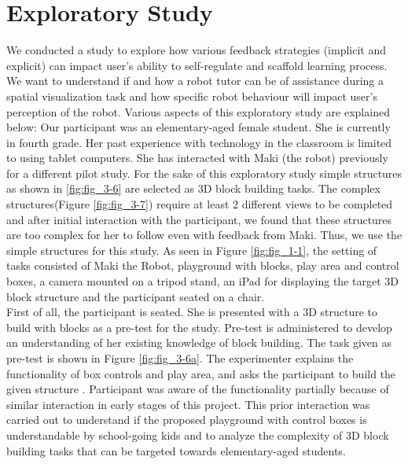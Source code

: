 \chapter{Exploratory Study}
\label{chap:four}

We conducted a study to explore how various feedback strategies (implicit and explicit) can impact user's ability to self-regulate and scaffold learning process. We want to understand if and how a robot tutor can be of assistance during a spatial visualization task and how specific robot behaviour will impact user's perception of the robot. Various aspects of this exploratory study are explained below:
Our participant was an elementary-aged female student. She is currently in fourth grade. Her past experience with technology in the classroom is limited to using tablet computers. She has interacted with Maki (the robot) previously for a different pilot study.
For the sake of this exploratory study simple structures as shown in \ref{fig:fig_3-6} are selected as 3D block building tasks. The complex structures(Figure \ref{fig:fig_3-7}) require at least 2 different views to be completed and after initial interaction with the participant, we found that these structures are too complex for her to follow even with feedback from Maki. Thus, we use the simple structures for this study.
As seen in Figure \ref{fig:fig_1-1}, the setting of tasks consisted of Maki the Robot, playground with blocks, play area and control boxes, a camera mounted on a tripod stand, an iPad for displaying the target 3D block structure and the participant seated on a chair. \\
First of all, the participant is seated. She is presented with a 3D structure to build with blocks as a pre-test for the study. Pre-test is administered to develop an understanding of her existing knowledge of block building. The task given as pre-test is shown in Figure \ref{fig:fig_3-6a}. The experimenter explains the functionality of box controls and play area, and asks the participant to build the given structure . Participant was aware of the functionality partially because of similar interaction in early stages of this project. This prior interaction was carried out to understand if the proposed playground with control boxes is understandable by school-going kids and to analyze the complexity of 3D block building tasks that can be targeted towards elementary-aged students. \\
